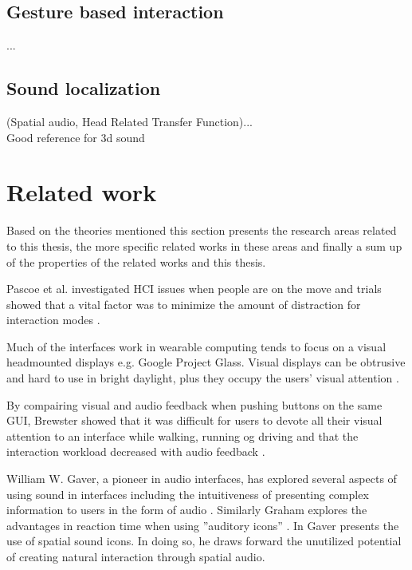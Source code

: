 
\subsection{Gesture based interaction}
...

\subsection{Sound localization}
(Spatial audio, Head Related Transfer Function)...\\
Good reference for 3d sound \cite{begault_3dd_1994}

\section{Related work}
Based on the theories mentioned this section presents the research areas related to this thesis, the more specific related works in these areas and finally a sum up of the properties of the related works and this thesis.

Pascoe et al. investigated HCI issues when people are on the move and trials showed that a vital factor was to minimize the amount of distraction for interaction modes \cite{pascoe_using_2000}.

Much of the interfaces work in wearable computing tends to focus on a visual headmounted displays \cite{barfield_fundamentals_2000} e.g. Google Project Glass. Visual displays can be obtrusive and hard to use in bright daylight, plus they occupy the users’ visual attention \cite{geelhoed_safety_2000}.

By compairing visual and audio feedback when pushing buttons on the same GUI, Brewster showed that it was difficult for users to devote all their visual attention to an interface while walking, running og driving and that the interaction workload decreased with audio feedback \cite{brewster_overcoming_2002}.

William W. Gaver, a pioneer in audio interfaces, has explored several aspects of using sound in interfaces including the intuitiveness of presenting complex information to users in the form of audio \cite{gaver_sonicfinder:_1989}. Similarly Graham explores the advantages in reaction time when using ”auditory icons” \cite{graham_use_1999}. In \cite{gaver_auditory_1986} Gaver presents the use of spatial sound icons. In doing so, he draws forward the unutilized potential of creating natural interaction through spatial audio.

